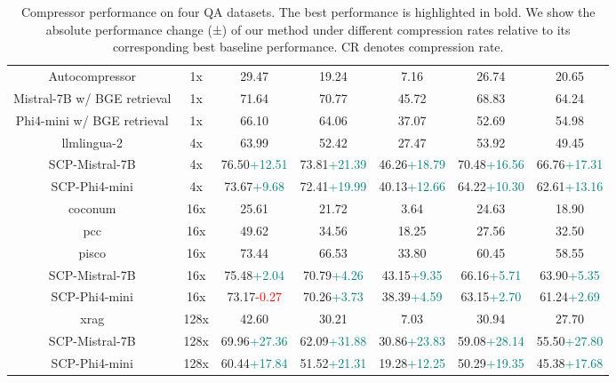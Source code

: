 \documentclass{applemlr}
\numberwithin{equation}{section}
\begin{document}
\begin{table}[!t]
\begin{tabular}{ccccccc}
\hline
\cline{2-7}
\rowcolor{gray!15}
\multicolumn{7}{c}{\textbf{Oracle}} \\
\hline
Autocompressor & 1x & 29.47 & 19.24 & 7.16 & 26.74 & 20.65 \\
Mistral-7B w/ BGE retrieval & 1x & 71.64 & 70.77 & 45.72 & 68.83 & 64.24 \\
Phi4-mini w/ BGE retrieval & 1x & 66.10 & 64.06 & 37.07 & 52.69 & 54.98 \\
\hline 

llmlingua-2 & 4x & 63.99 & 52.42 & 27.47 & 53.92 & 49.45 \\
SCP-Mistral-7B & 4x & 76.50\tiny\textcolor{teal}{+12.51} & 73.81\tiny\textcolor{teal}{+21.39} & 46.26\tiny\textcolor{teal}{+18.79} & 70.48\tiny\textcolor{teal}{+16.56} & 66.76\tiny\textcolor{teal}{+17.31} \\
SCP-Phi4-mini  & 4x & 73.67\tiny\textcolor{teal}{+9.68} & 72.41\tiny\textcolor{teal}{+19.99} & 40.13\tiny\textcolor{teal}{+12.66} & 64.22\tiny\textcolor{teal}{+10.30} & 62.61\tiny\textcolor{teal}{+13.16} \\

\hline 
coconum & 16x & 25.61 & 21.72 & 3.64 & 24.63 & 18.90 \\
pcc & 16x & 49.62 & 34.56 & 18.25 & 27.56 & 32.50 \\
pisco & 16x & 73.44 & 66.53 & 33.80 & 60.45 & 58.55 \\
SCP-Mistral-7B& 16x & 75.48\tiny\textcolor{teal}{+2.04} & 70.79\tiny\textcolor{teal}{+4.26} & 43.15\tiny\textcolor{teal}{+9.35} & 66.16\tiny\textcolor{teal}{+5.71} & 63.90\tiny\textcolor{teal}{+5.35} \\
SCP-Phi4-mini  & 16x & 73.17\tiny\textcolor{red}{-0.27} & 70.26\tiny\textcolor{teal}{+3.73} & 38.39\tiny\textcolor{teal}{+4.59} & 63.15\tiny\textcolor{teal}{+2.70} & 61.24\tiny\textcolor{teal}{+2.69} \\


\hline 
xrag & 128x & 42.60 & 30.21 & 7.03 & 30.94 & 27.70 \\
SCP-Mistral-7B & 128x & 69.96\tiny\textcolor{teal}{+27.36} & 62.09\tiny\textcolor{teal}{+31.88} & 30.86\tiny\textcolor{teal}{+23.83} & 59.08\tiny\textcolor{teal}{+28.14} & 55.50\tiny\textcolor{teal}{+27.80} \\
SCP-Phi4-mini  & 128x & 60.44\tiny\textcolor{teal}{+17.84} & 51.52\tiny\textcolor{teal}{+21.31} & 19.28\tiny\textcolor{teal}{+12.25} & 50.29\tiny\textcolor{teal}{+19.35} & 45.38\tiny\textcolor{teal}{+17.68} \\

\toprule
\end{tabular}
\caption{Compressor performance on four QA datasets. The best performance is highlighted in bold. We show the absolute performance change (±) of our method under different compression rates relative to its corresponding best baseline performance. CR denotes compression rate.
 }
\label{result:compression}
\end{table}
\end{document}
